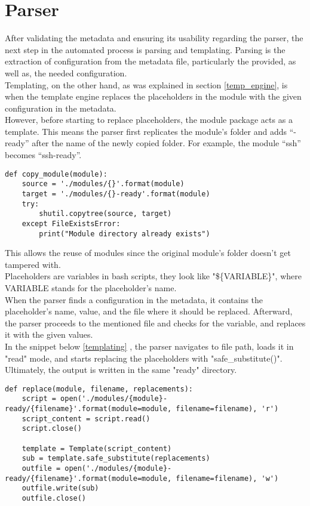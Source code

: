 \section{Parser}
After validating the metadata and ensuring its usability regarding the parser, the next step in the automated process is parsing and templating. Parsing is the extraction of configuration from the metadata file, particularly the provided, as well as, the needed configuration.\\
Templating, on the other hand, as was explained in section \ref{temp_engine}, is when the template engine replaces the placeholders in the module with the given configuration in the metadata.\\ However, before starting to replace placeholders, the module package acts as a template. This means the parser first replicates the module’s folder and adds “-ready” after the name of the newly copied folder. For example, the module “ssh” becomes “ssh-ready”.\\

\begin{lstlisting}[caption=Copying directories, style=pythonstyle]
def copy_module(module):
    source = './modules/{}'.format(module)
    target = './modules/{}-ready'.format(module)
    try:
        shutil.copytree(source, target)
    except FileExistsError:
        print("Module directory already exists")
\end{lstlisting}
This allows the reuse of modules since the original module’s folder doesn’t get tampered with.\\
Placeholders are variables in bash scripts, they look like "\$\{VARIABLE\}", where VARIABLE stands for the placeholder’s name.\\ When the parser finds a configuration in the metadata, it contains the placeholder’s name, value, and the file where it should be replaced. Afterward, the parser proceeds to the mentioned file and checks for the variable, and replaces it with the given values.\\
In the snippet below \ref{templating} , the parser navigates to file path, loads it in "read" mode, and starts replacing the placeholders with "safe\_substitute()". Ultimately, the output is written in the same "ready" directory.

\begin{lstlisting}[caption=Templaing, style=pythonstyle, label=templating]
def replace(module, filename, replacements):
    script = open('./modules/{module}-ready/{filename}'.format(module=module, filename=filename), 'r')
    script_content = script.read()
    script.close()

    template = Template(script_content)
    sub = template.safe_substitute(replacements)
    outfile = open('./modules/{module}-ready/{filename}'.format(module=module, filename=filename), 'w')
    outfile.write(sub)
    outfile.close()
\end{lstlisting}

